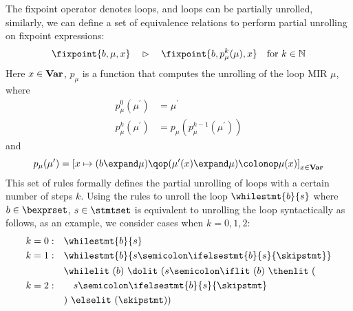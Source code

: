 The fixpoint operator denotes loops, and loops can be partially unrolled,
similarly, we can define a set of equivalence relations to perform partial
unrolling on fixpoint expressions:
\begin{equation}
    \fixpoint{b, \mu, x}
    \quad \eqrel \quad
    \fixpoint{b, p_\mu^k(\mu), x} \quad \text{for $k \in \naturalset$}
    \label{eq:unroll}
\end{equation}
Here $x \in \mathbf{Var}$, $p_\mu$ is a function that computes the unrolling
of the loop MIR $\mu$, where
\begin{align}
    p_\mu^0(\mu^\prime) &= \mu^\prime \\
    p_\mu^k(\mu^\prime) &= p_\mu(p_\mu^{k - 1}(\mu^\prime))
\end{align}
and 
\begin{equation}
    p_\mu(\mu^\prime) = {\left[
        x \mapsto ( b \expand \mu ) \qop
            ( \mu^\prime(x) \expand \mu ) \colonop \mu(x)
    \right]}_{x \in \varset}
\end{equation}
This set of rules formally defines the partial unrolling of loops with
a certain number of steps $k$.  Using the rules to unroll the loop
$\whilestmt{b}{s}$ where $b \in \bexprset$, $s \in \stmtset$ is equivalent to
unrolling the loop syntactically as follows, as an example, we consider cases
when $k = 0, 1, 2$:
\begin{equation}
    \begin{aligned}
        k = 0: & \quad
        \whilestmt{b}{s} \\
        k = 1: & \quad
        \whilestmt{b}{s \semicolon \ifelsestmt{b}{s}{\skipstmt}} \\
        k = 2: & \quad
        \begin{aligned}
            & \whilelit~(b)~\dolit~(
                s \semicolon \iflit~(b)~\thenlit~( \\
            & \quad s \semicolon \ifelsestmt{b}{s}{\skipstmt} \\
            & )~\elselit~(\skipstmt))
        \end{aligned}
    \end{aligned}
\end{equation}

